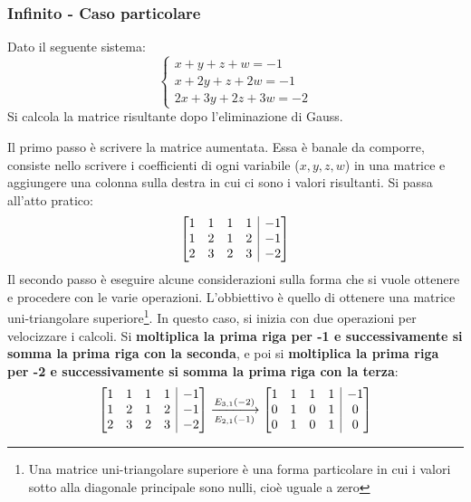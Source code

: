 \documentclass[a4paper]{article}
\makeatletter
\newenvironment{rowequmatbra}[1]{\left[\array{@{}#1@{}}}{\endarray\right]}
\makeatother
\begin{document}
	\subsubsection{Infinito - Caso particolare}
	
	Dato il seguente sistema:
	\begin{equation*}
		\begin{cases}
			x + y + z + w = -1 	 \\
			x + 2y + z + 2w = -1 \\
			2x + 3y + 2z + 3w = -2
		\end{cases}
	\end{equation*}
	Si calcola la matrice risultante dopo l'eliminazione di Gauss.\newline
	
	\noindent
	Il \textcolor{Red3}{primo passo} è scrivere la matrice aumentata. Essa è banale da comporre, consiste nello scrivere i coefficienti di ogni variabile ($x,y,z,w$) in una matrice e aggiungere una colonna sulla destra in cui ci sono i valori risultanti. Si passa all'atto pratico:
	\begin{equation*}
		\begin{rowequmatbra}{cccc|c}
			1  &  1 &  1 &  1 & -1 	\\
			1  &  2 &  1 &  2 & -1	\\
			2  &  3 &  2 &  3 & -2
		\end{rowequmatbra}
	\end{equation*}
	Il \textcolor{Red3}{secondo passo} è eseguire alcune considerazioni sulla forma che si vuole ottenere e procedere con le varie operazioni. L'obbiettivo è quello di ottenere una matrice uni-triangolare superiore\footnote{Una matrice uni-triangolare superiore è una forma particolare in cui i valori sotto alla diagonale principale sono nulli, cioè uguale a zero}. In questo caso, si inizia con due operazioni per velocizzare i calcoli. Si \textbf{moltiplica la prima riga per -1 e successivamente si somma la prima riga con la seconda}, e poi si \textbf{moltiplica la prima riga per -2 e successivamente si somma la prima riga con la terza}:
	\begin{equation*}
		\begin{rowequmatbra}{cccc|c}
			1  &  1 &  1 &  1 & -1 	\\
			1  &  2 &  1 &  2 & -1	\\
			2  &  3 &  2 &  3 & -2
		\end{rowequmatbra} \xlongrightarrow[E_{2,1}\left(-1\right)]{E_{3,1}\left(-2\right)}
		\begin{rowequmatbra}{cccc|c}
			1  &  1 &  1 &  1 & -1 	\\
			0  &  1 &  0 &  1 &  0	\\
			0  &  1 &  0 &  1 &  0
		\end{rowequmatbra}
	\end{equation*}
\end{document}
